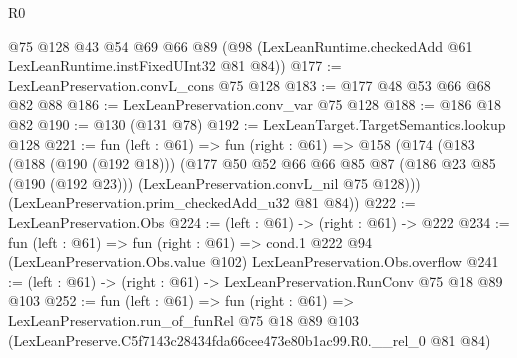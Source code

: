 \begin{lexlean}{R0}
\begin{coremodule}
    @75
    @128
    @43
    @54
    @69
    @66
    @89
    (@98 (LexLeanRuntime.checkedAdd @61 LexLeanRuntime.instFixedUInt32 @81 @84))
@177 := LexLeanPreservation.convL_cons @75 @128
@183 := @177 @48 @53 @66 @68 @82 @88
@186 := LexLeanPreservation.conv_var @75 @128
@188 := @186 @18 @82
@190 := @130 (@131 @78)
@192 := LexLeanTarget.TargetSemantics.lookup @128
@221 := fun (left : @61) =>
  fun (right : @61) =>
  @158
    (@174
      (@183
        (@188 (@190 (@192 @18)))
        (@177
          @50
          @52
          @66
          @66
          @85
          @87
          (@186 @23 @85 (@190 (@192 @23)))
          (LexLeanPreservation.convL_nil @75 @128)))
      (LexLeanPreservation.prim_checkedAdd_u32 @81 @84))
@222 := LexLeanPreservation.Obs
@224 := (left : @61) -> (right : @61) -> @222
@234 := fun (left : @61) =>
  fun (right : @61) =>
  cond.{1} @222 @94 (LexLeanPreservation.Obs.value @102) LexLeanPreservation.Obs.overflow
@241 := (left : @61) -> (right : @61) -> LexLeanPreservation.RunConv @75 @18 @89 @103
@252 := fun (left : @61) =>
  fun (right : @61) =>
  LexLeanPreservation.run_of_funRel
    @75
    @18
    @89
    @103
    (LexLeanPreserve.C5f7143c28434fda66cee473e80b1ac99.R0.__rel_0 @81 @84)
\end{coremodule}
\end{lexlean}

